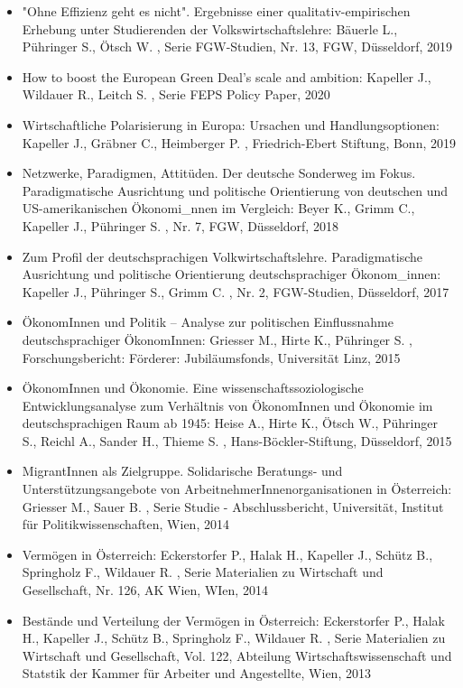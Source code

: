 \begin{itemize}
\item "Ohne Effizienz geht es nicht". Ergebnisse einer qualitativ-empirischen Erhebung unter Studierenden der Volkswirtschaftslehre: Bäuerle L., Pühringer S., Ötsch W. , Serie FGW-Studien, Nr. 13, FGW, Düsseldorf, 2019
\item How to boost the European Green Deal’s scale and ambition: Kapeller J., Wildauer R., Leitch S. , Serie FEPS Policy Paper, 2020
\item Wirtschaftliche Polarisierung in Europa: Ursachen und Handlungsoptionen: Kapeller J., Gräbner C., Heimberger P. , Friedrich-Ebert Stiftung, Bonn, 2019
\item Netzwerke, Paradigmen, Attitüden. Der deutsche Sonderweg im Fokus. Paradigmatische Ausrichtung und politische Orientierung von deutschen und US-amerikanischen Ökonomi_nnen im Vergleich: Beyer K., Grimm C., Kapeller J., Pühringer S. , Nr. 7, FGW, Düsseldorf, 2018
\item Zum Profil der deutschsprachigen Volkwirtschaftslehre. Paradigmatische Ausrichtung und politische Orientierung deutschsprachiger Ökonom_innen: Kapeller J., Pühringer S., Grimm C. , Nr. 2, FGW-Studien, Düsseldorf, 2017
\item ÖkonomInnen und Politik – Analyse zur politischen Einflussnahme deutschsprachiger ÖkonomInnen: Griesser M., Hirte K., Pühringer S. , Forschungsbericht: Förderer: Jubiläumsfonds, Universität Linz, 2015
\item ÖkonomInnen und Ökonomie. Eine wissenschaftssoziologische Entwicklungsanalyse zum Verhältnis von ÖkonomInnen und Ökonomie im deutschsprachigen Raum ab 1945: Heise A., Hirte K., Ötsch W., Pühringer S., Reichl A., Sander H., Thieme S. , Hans-Böckler-Stiftung, Düsseldorf, 2015
\item MigrantInnen als Zielgruppe. Solidarische Beratungs- und Unterstützungsangebote von ArbeitnehmerInnenorganisationen in Österreich: Griesser M., Sauer B. , Serie Studie - Abschlussbericht, Universität, Institut für Politikwissenschaften, Wien, 2014
\item Vermögen in Österreich: Eckerstorfer P., Halak H., Kapeller J., Schütz B., Springholz F., Wildauer R. , Serie Materialien zu Wirtschaft und Gesellschaft, Nr. 126, AK Wien, WIen, 2014
\item Bestände und Verteilung der Vermögen in Österreich: Eckerstorfer P., Halak H., Kapeller J., Schütz B., Springholz F., Wildauer R. , Serie Materialien zu Wirtschaft und Gesellschaft, Vol. 122, Abteilung Wirtschaftswissenschaft und Statstik der Kammer für Arbeiter und Angestellte, Wien, 2013

\end{itemize}
